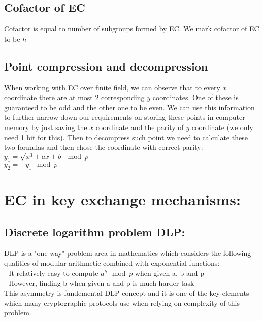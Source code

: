 \documentclass[bp,en]{FEIstyle}
\begin{document}
\subsection*{Cofactor of EC}
Cofactor is equal to number of subgroups formed by EC. We mark cofactor of EC to be $h$



\subsection*{Point compression and decompression}
When working with EC over finite field, we can observe that to every $x$ coordinate there are at most 2 corresponding $y$ coordinates. One of these is guaranteed to be odd and the other one to be even. We can use this information to further narrow down our requirements on storing these points in computer memory by just saving the $x$ coordinate and the parity of $y$ coordinate (we only need 1 bit for this). Then to decompress such point we need to calculate these two formulas and then chose the coordinate with correct parity: \\
    $y_1 = \sqrt{x^3 + ax + b} \mod p$\\ $y_2 = - y_1 \mod p$
\newpage

\section*{EC in key exchange mechanisms:}

\subsection*{Discrete logarithm problem DLP:}

DLP is a "one-way" problem area in mathematics which considers the following qualities of modular arithmetic combined with exponential functions:\\
- It relatively easy to compute $a^b \mod{p}$ when given a, b and p\\
- However, finding b when given a and p is much harder task\\ 
This asymmetry is fundemental DLP concept and it is one of the key 
elements which many cryptographic protocols use when relying on complexity of this problem.
\end{document}
